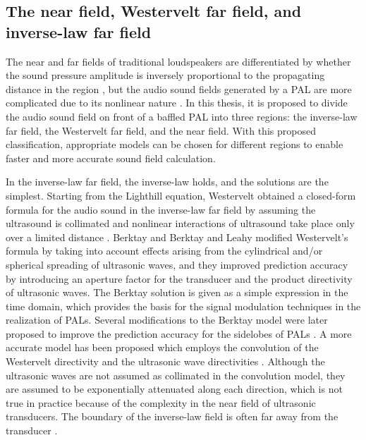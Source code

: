 \subsection{The near field, Westervelt far field, and inverse-law far field}
The near and far fields of traditional loudspeakers are differentiated by whether the sound pressure amplitude is inversely proportional to the propagating distance in the region \cite{Foote2014DiscriminatingNearfieldFarfield}, 
but the audio sound fields generated by a PAL are more complicated due to its nonlinear nature \cite{Cervenka2019VersatileComputationalApproach}.
In this thesis, it is proposed to divide the audio sound field on front of a baffled PAL into three regions: the inverse-law far field, the Westervelt far field, and the near field. 
With this proposed classification, appropriate models can be chosen for different regions to enable faster and more accurate sound field calculation.

In the inverse-law far field, the inverse-law holds, and the solutions are the simplest. 
Starting from the Lighthill equation,
Westervelt obtained a closed-form formula for the audio sound in the inverse-law far field by assuming the ultrasound is collimated and nonlinear interactions of ultrasound take place only over a limited distance \cite{Westervelt1963ParametricAcousticArray}.
Berktay \cite{Berktay1965PossibleExploitationNonlinear} and Berktay and Leahy \cite{Berktay1974FarfieldPerformanceParametric} modified Westervelt's formula by taking into account effects arising from the cylindrical and/or spherical spreading of ultrasonic waves, 
and they improved prediction accuracy by introducing an aperture factor for the transducer and the product directivity of ultrasonic waves.
The Berktay solution is given as a simple expression in the time domain, which provides the basis for the signal modulation techniques in the realization of PALs.
Several modifications to the Berktay model were later proposed to improve the prediction accuracy for the sidelobes of PALs \cite{Shi2012ProductDirectivityModels}. 
A more accurate model has been proposed which employs the convolution of the Westervelt directivity and the ultrasonic wave directivities \cite{Shi2015ConvolutionModelComputing, Guasch2018FarfieldDirectivityParametric, Mellen1978NumericalMethodCalculating, Moffett1981NearfieldCharacteristicsParametric}.
Although the ultrasonic waves are not assumed as collimated in the convolution model, they are assumed to be exponentially attenuated along each direction, 
which is not true in practice because of the complexity in the near field of ultrasonic transducers. The boundary of the inverse-law field is often far away from the transducer \cite{Moffett1981NearfieldCharacteristicsParametric}.

